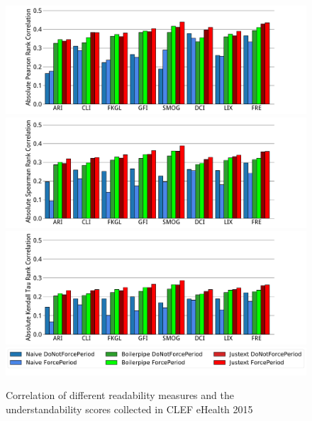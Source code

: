 \documentclass[runningheads,a4paper]{llncs}
\begin{document}
\begin{figure}[th!]
   \centering
   \includegraphics[width=1.\textwidth]{graphics/bar_corr_pearson15_values}
   \includegraphics[width=1.00\textwidth]{graphics/bar_corr_spearman15_values}
   \includegraphics[width=1.00\textwidth]{graphics/bar_corr_kendalltau15_values}
   \includegraphics[width=1\textwidth]{graphics/legend62}
    \caption{Correlation of different readability measures and the understandability scores collected in CLEF eHealth 2015}
   \label{fig:bar_corr_clef15}
\end{figure}
\end{document}
